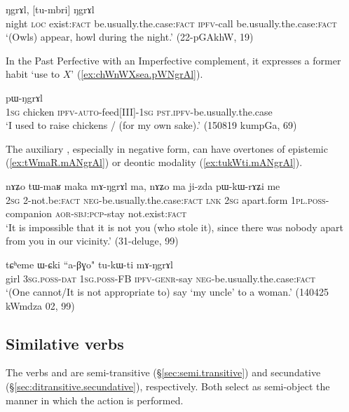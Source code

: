 \begin{exe}
\ex \label{ex:tu.NgrAl}
  ŋgrɤl, [tu-mbri] ŋgrɤl \\
night \textsc{loc} exist:\textsc{fact} be.usually.the.case:\textsc{fact} \textsc{ipfv}-call be.usually.the.case:\textsc{fact} \\
\glt `(Owls) appear, howl during the night.' (22-pGAkhW, 19)
\end{exe}

In the Past Perfective with an Imperfective complement, it expresses a former habit `use to $X$'  (\ref{ex:chWnWXsea.pWNgrAl}).

\begin{exe}
\ex \label{ex:chWnWXsea.pWNgrAl}
  pɯ-ŋgrɤl  \\
\textsc{1sg}  chicken \textsc{ipfv}-\textsc{auto}-feed[III]-\textsc{1sg} \textsc{pst}.\textsc{ipfv}-be.usually.the.case \\
\glt `I used to raise chickens / (for my own sake).' (150819 kumpGa, 69)
\end{exe}

The auxiliary , especially in negative form, can have overtones of epistemic (\ref{ex:tWmaR.mANgrAl}) or deontic modality (\ref{ex:tukWti.mANgrAl}).

\begin{exe}
\ex \label{ex:tWmaR.mANgrAl}
 \gll nɤʑo tɯ-maʁ maka mɤ-ŋgrɤl ma, nɤʑo ma ji-zda pɯ-kɯ-rɤʑi me \\
 \textsc{2sg} 2-not.be:\textsc{fact} \textsc{neg}-be.usually.the.case:\textsc{fact} \textsc{lnk} \textsc{2sg} apart.form \textsc{1pl}.\textsc{poss}-companion \textsc{aor}-\textsc{sbj}:\textsc{pcp}-stay not.exist:\textsc{fact} \\
\glt `It is impossible that it is not you (who stole it), since there was nobody apart from you in our vicinity.' (31-deluge, 99)
\end{exe}

\begin{exe}
\ex \label{ex:tukWti.mANgrAl}
 \gll tɕʰeme ɯ-ɕki ``a-βɣo" tu-kɯ-ti mɤ-ŋgrɤl \\
 girl \textsc{3sg}.\textsc{poss}-\textsc{dat} \textsc{1sg}.\textsc{poss}-FB \textsc{ipfv}-\textsc{genr}-say \textsc{neg}-be.usually.the.case:\textsc{fact} \\
\glt `(One cannot/It is not appropriate to) say `my uncle' to a woman.' (140425 kWmdza 02, 99)
\end{exe} 

\subsection{Similative verbs}  \label{sec:similative.verb.complementation}
The verbs  and   are semi-transitive (§\ref{sec:semi.transitive}) and secundative (§\ref{sec:ditransitive.secundative}), respectively. Both select as semi-object the manner in which the action is performed.

